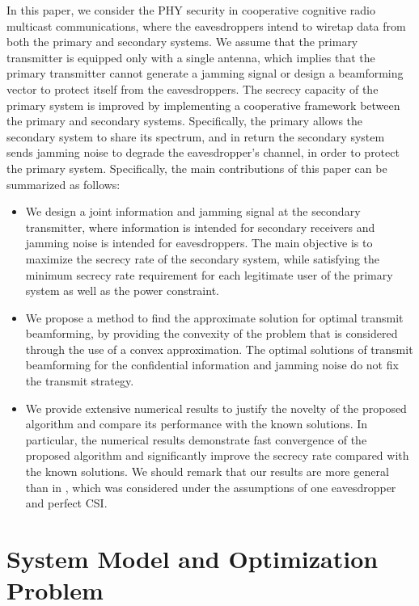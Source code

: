 \documentclass[journal,twoside]{IEEEtran}
\begin{document}
In this paper, we consider the PHY security in cooperative cognitive radio multicast communications, where the eavesdroppers intend to wiretap  data from both the primary  and  secondary systems. We assume that the primary transmitter  is equipped only with a single antenna, which implies that the primary transmitter cannot generate a jamming signal or design a beamforming vector to protect itself from the eavesdroppers. The secrecy capacity of the primary system is improved by implementing a cooperative framework between the primary  and secondary systems. Specifically, the primary  allows the secondary system to share its spectrum, and in return the secondary system sends jamming noise to degrade the eavesdropper's channel, in order to protect the primary system.  
 Specifically, the main contributions of this paper can be summarized as follows:
\begin{itemize}
	
	\item We design a joint information and jamming signal at the secondary transmitter, where information is intended for secondary receivers  and jamming noise is intended for eavesdroppers. The main objective is to maximize the secrecy rate of the secondary system, while satisfying the minimum secrecy rate requirement for each legitimate user of the primary system as well as  the  power constraint.
	\item We propose a method to find the approximate solution for optimal transmit beamforming,  by providing the convexity of the problem that is considered through the use of   a convex approximation.  The optimal solutions of transmit beamforming for the confidential information and jamming noise do not fix the transmit strategy. 
	\item We provide extensive numerical results to justify the novelty of the proposed algorithm and compare its performance with the known solutions. In particular, the numerical results demonstrate fast convergence of the proposed algorithm and significantly improve the secrecy rate compared with the known solutions. We should remark that our results are more general than in \cite{Zhu:VT:15}, which was considered under the assumptions of one eavesdropper and perfect CSI.
	
	\end{itemize}
	

\section{System Model and Optimization Problem} \label{System Model}
\end{document}
